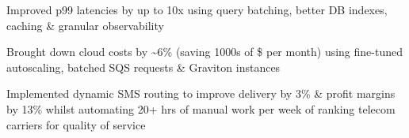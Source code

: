 \documentclass[]{AayushSarva}
\begin{document}
\begin{minipage}[t]{0.66\textwidth}
\begin{tightemize}
\end{tightemize}
\vspace{0.5em}




\begin{tightemize}

\item Improved p99 latencies by up to 10x using query batching, better DB indexes, caching \& granular observability

\item Brought down cloud costs by \textasciitilde6\% (saving 1000s of \$ per month) using fine-tuned autoscaling, batched SQS requests \& Graviton instances


\end{tightemize}
\vspace{0.5em}



\begin{tightemize}

\item Implemented dynamic SMS routing to improve delivery by 3\% \& profit margins by 13\% whilst automating 20+ hrs of manual work per week of ranking telecom carriers for quality of service


\end{tightemize}
\end{minipage}
\end{document}
